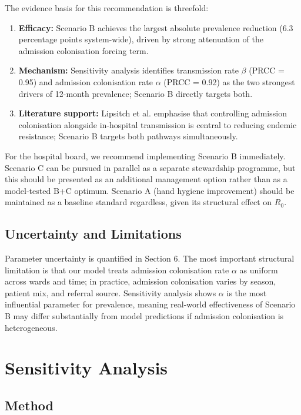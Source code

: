 \documentclass[12pt,a4paper]{article}
\begin{document}
The evidence basis for this recommendation is threefold:
\begin{enumerate}
  \item \textbf{Efficacy:} Scenario B achieves the largest absolute prevalence reduction (6.3 percentage points system-wide), driven by strong attenuation of the admission colonisation forcing term.
  \item \textbf{Mechanism:} Sensitivity analysis identifies transmission rate $\beta$ (PRCC = 0.95) and admission colonisation rate $\alpha$ (PRCC = 0.92) as the two strongest drivers of 12-month prevalence; Scenario B directly targets both.
  \item \textbf{Literature support:} Lipsitch et al. \cite{lipsitch2000} emphasise that controlling admission colonisation alongside in-hospital transmission is central to reducing endemic resistance; Scenario B targets both pathways simultaneously.
\end{enumerate}

For the hospital board, we recommend implementing Scenario B immediately. Scenario C can be pursued in parallel as a separate stewardship programme, but this should be presented as an additional management option rather than as a model-tested B+C optimum. Scenario A (hand hygiene improvement) should be maintained as a baseline standard regardless, given its structural effect on $R_0$.

\subsection{Uncertainty and Limitations}

Parameter uncertainty is quantified in Section 6. The most important structural limitation is that our model treats admission colonisation rate $\alpha$ as uniform across wards and time; in practice, admission colonisation varies by season, patient mix, and referral source. Sensitivity analysis shows $\alpha$ is the most influential parameter for prevalence, meaning real-world effectiveness of Scenario B may differ substantially from model predictions if admission colonisation is heterogeneous.

\section{Sensitivity Analysis}

\subsection{Method}
\end{document}
